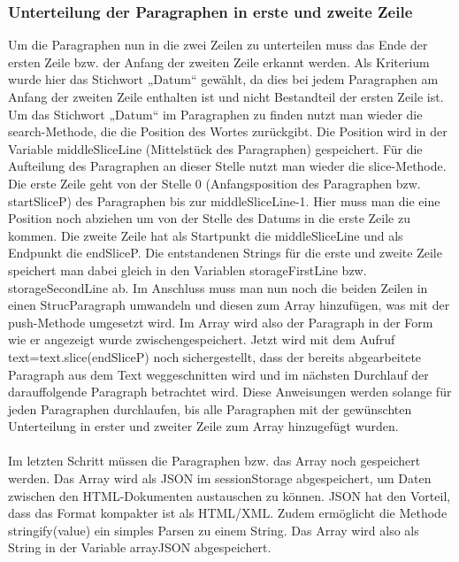 {\subsubsection{Unterteilung der Paragraphen in erste und zweite Zeile}
Um die Paragraphen nun in die zwei Zeilen zu unterteilen muss das Ende der ersten Zeile bzw. der Anfang der zweiten Zeile erkannt werden. Als Kriterium wurde hier das Stichwort „Datum“ gewählt, da dies bei jedem Paragraphen am Anfang der zweiten Zeile enthalten ist und nicht Bestandteil der ersten Zeile ist. Um das Stichwort „Datum“ im Paragraphen zu finden nutzt man wieder die search-Methode, die die Position des Wortes zurückgibt. Die Position wird in der Variable middleSliceLine (Mittelstück des Paragraphen) gespeichert. Für die Aufteilung des Paragraphen an dieser Stelle nutzt man wieder die slice-Methode. Die erste Zeile geht von der Stelle 0 (Anfangsposition des Paragraphen bzw. startSliceP) des Paragraphen bis zur middleSliceLine-1. Hier muss man die eine Position noch abziehen um von der Stelle des Datums in die erste Zeile zu kommen. Die zweite Zeile hat als Startpunkt die middleSliceLine und als Endpunkt die endSliceP. Die entstandenen Strings für die erste und zweite Zeile speichert man dabei gleich in den Variablen storageFirstLine bzw. storageSecondLine ab. Im Anschluss muss man nun noch die beiden Zeilen in einen StrucParagraph umwandeln und diesen zum Array hinzufügen, was mit der push-Methode umgesetzt wird. Im Array wird also der Paragraph in der Form wie er angezeigt wurde zwischengespeichert. Jetzt wird mit dem Aufruf text=text.slice(endSliceP) noch sichergestellt, dass der bereits abgearbeitete Paragraph aus dem Text weggeschnitten wird und im nächsten Durchlauf der darauffolgende Paragraph betrachtet wird.
Diese Anweisungen werden solange für jeden Paragraphen durchlaufen, bis alle Paragraphen mit der gewünschten Unterteilung in erster und zweiter Zeile zum Array hinzugefügt wurden.\\
\\
Im letzten Schritt müssen die Paragraphen bzw. das Array noch gespeichert werden. Das Array wird als \ac{JSON} im sessionStorage abgespeichert, um Daten zwischen den HTML-Dokumenten austauschen zu können. JSON hat den Vorteil, dass das Format kompakter ist als HTML/XML. Zudem ermöglicht die Methode stringify(value) ein simples Parsen zu einem String. Das Array wird also als String in der Variable arrayJSON abgespeichert. 

}

